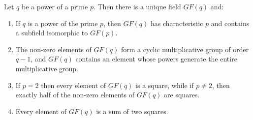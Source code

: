 Let $q$ be a power of a prime $p$. Then there is a unique field $GF(q)$ and:
\begin{enumerate}
\item[(i)] If $q$ is a power of the prime $p$, then $GF(q)$ has characteristic $p$ and contains a subfield isomorphic to $GF(p)$.
\item[(ii)] The non-zero elements of $GF(q)$ form a cyclic multiplicative group of order $q-1$, and $GF(q)$ contains an element whose powers generate the entire multiplicative group.
\item[(iii)] If $p=2$ then every element of $GF(q)$ is a square, while if $p \neq 2$, then exactly half of the non-zero elements of $GF(q)$ are squares.
\item[(iv)] Every element of $GF(q)$ is a sum of two squares.
\end{enumerate}
